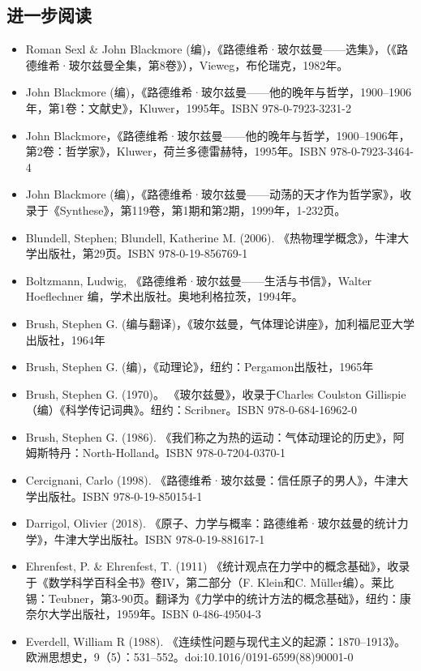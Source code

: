 \subsection{进一步阅读}
\begin{itemize}
\item Roman Sexl & John Blackmore (编)，《路德维希·玻尔兹曼——选集》，（《路德维希·玻尔兹曼全集，第8卷》），Vieweg，布伦瑞克，1982年。
\item John Blackmore (编)，《路德维希·玻尔兹曼——他的晚年与哲学，1900–1906年，第1卷：文献史》，Kluwer，1995年。ISBN 978-0-7923-3231-2
\item John Blackmore，《路德维希·玻尔兹曼——他的晚年与哲学，1900–1906年，第2卷：哲学家》，Kluwer，荷兰多德雷赫特，1995年。ISBN 978-0-7923-3464-4
\item John Blackmore (编)，《路德维希·玻尔兹曼——动荡的天才作为哲学家》，收录于《Synthese》，第119卷，第1期和第2期，1999年，1-232页。
\item Blundell, Stephen; Blundell, Katherine M. (2006). 《热物理学概念》，牛津大学出版社，第29页。ISBN 978-0-19-856769-1
\item Boltzmann, Ludwig, 《路德维希·玻尔兹曼——生活与书信》，Walter Hoeflechner 编，学术出版社。奥地利格拉茨，1994年。
\item Brush, Stephen G. (编与翻译)，《玻尔兹曼，气体理论讲座》，加利福尼亚大学出版社，1964年
\item Brush, Stephen G. (编)，《动理论》，纽约：Pergamon出版社，1965年
\item Brush, Stephen G. (1970)。 《玻尔兹曼》，收录于Charles Coulston Gillispie（编）《科学传记词典》。纽约：Scribner。ISBN 978-0-684-16962-0
\item Brush, Stephen G. (1986). 《我们称之为热的运动：气体动理论的历史》，阿姆斯特丹：North-Holland。ISBN 978-0-7204-0370-1
\item Cercignani, Carlo (1998). 《路德维希·玻尔兹曼：信任原子的男人》，牛津大学出版社。ISBN 978-0-19-850154-1
\item Darrigol, Olivier (2018). 《原子、力学与概率：路德维希·玻尔兹曼的统计力学》，牛津大学出版社。ISBN 978-0-19-881617-1
\item Ehrenfest, P. & Ehrenfest, T. (1911) 《统计观点在力学中的概念基础》，收录于《数学科学百科全书》卷IV，第二部分（F. Klein和C. Müller编）。莱比锡：Teubner，第3-90页。翻译为《力学中的统计方法的概念基础》，纽约：康奈尔大学出版社，1959年。ISBN 0-486-49504-3
\item Everdell, William R (1988). 《连续性问题与现代主义的起源：1870–1913》。欧洲思想史，9（5）：531–552。doi:10.1016/0191-6599(88)90001-0

\end{itemize}
